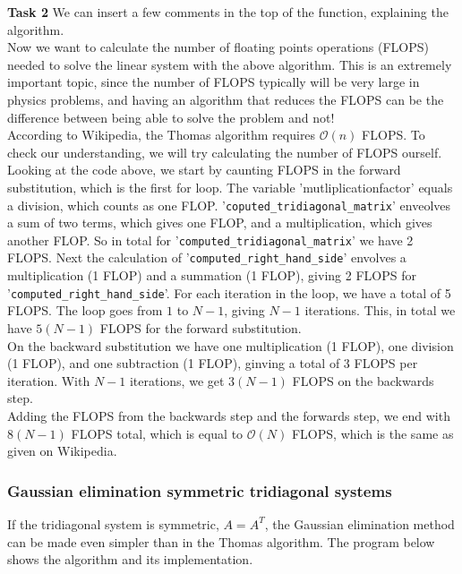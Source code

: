 \documentclass{article}
\begin{document}
\textbf{Task 2} We can insert a few comments in the top of the function, explaining the algorithm. \\

Now we want to calculate the number of floating points operations (FLOPS) needed to solve the linear system with the above algorithm. This is an extremely important topic, since the number of FLOPS typically will be very large in physics problems, and having an algorithm that reduces the FLOPS can be the difference between being able to solve the problem and not!\\

According to Wikipedia, the Thomas algorithm requires $\mathcal{O}(n)$ FLOPS. To check our understanding, we will try calculating the number of FLOPS ourself. Looking at the code above, we start by caunting FLOPS in the forward substitution, which is the first for loop. The variable 'mutliplicationfactor' equals a division, which counts as one FLOP. '\texttt{coputed\_tridiagonal\_matrix}' enveolves a sum of two terms, which gives one FLOP, and a multiplication, which gives another FLOP. So in total for '\texttt{computed\_tridiagonal\_matrix}' we have 2 FLOPS. Next the calculation of '\texttt{computed\_right\_hand\_side}' envolves a multiplication (1 FLOP) and a summation (1 FLOP), giving 2 FLOPS for '\texttt{computed\_right\_hand\_side}'. For each iteration in the loop, we have a total of 5 FLOPS. The loop goes from $1$ to $N-1$, giving $N-1$ iterations. This, in total we have $5(N-1)$ FLOPS for the forward substitution.\\

On the backward substitution we have one multiplication (1 FLOP), one division (1 FLOP), and one subtraction (1 FLOP), ginving a total of 3 FLOPS per iteration. With $N-1$ iterations, we get $3(N-1)$ FLOPS on the backwards step.\\

Adding the FLOPS from the backwards step and the forwards step, we end with $8(N-1)$ FLOPS total, which is equal to $\mathcal{O}(N)$ FLOPS, which is the same as given on Wikipedia.

\subsubsection{Gaussian elimination symmetric tridiagonal systems}
If the tridiagonal system is symmetric, $A = A^T$, the Gaussian elimination method can be made even simpler than in the Thomas algorithm. The program below shows the algorithm and its implementation.
\end{document}
